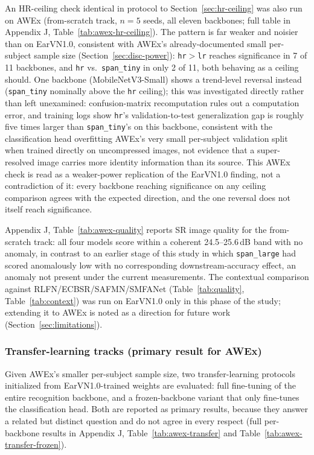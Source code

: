 \documentclass[pdflatex,sn-vancouver-num]{sn-jnl}
\begin{document}
An HR-ceiling check identical in protocol to Section~\ref{sec:hr-ceiling} was also run on AWEx (from-scratch track, $n=5$ seeds, all eleven backbones; full table in Appendix J, Table~\ref{tab:awex-hr-ceiling}). The pattern is far weaker and noisier than on EarVN1.0, consistent with AWEx's already-documented small per-subject sample size (Section~\ref{sec:disc-power}): \texttt{hr}$>$\texttt{lr} reaches significance in 7 of 11 backbones, and \texttt{hr} vs.\ \texttt{span\_tiny} in only 2 of 11, both behaving as a ceiling should. One backbone (MobileNetV3-Small) shows a trend-level reversal instead (\texttt{span\_tiny} nominally above the \texttt{hr} ceiling); this was investigated directly rather than left unexamined: confusion-matrix recomputation rules out a computation error, and training logs show \texttt{hr}'s validation-to-test generalization gap is roughly five times larger than \texttt{span\_tiny}'s on this backbone, consistent with the classification head overfitting AWEx's very small per-subject validation split when trained directly on uncompressed images, not evidence that a super-resolved image carries more identity information than its source. This AWEx check is read as a weaker-power replication of the EarVN1.0 finding, not a contradiction of it: every backbone reaching significance on any ceiling comparison agrees with the expected direction, and the one reversal does not itself reach significance.

Appendix J, Table~\ref{tab:awex-quality} reports SR image quality for the from-scratch track: all four models score within a coherent 24.5--25.6\,dB band with no anomaly, in contrast to an earlier stage of this study in which \texttt{span\_large} had scored anomalously low with no corresponding downstream-accuracy effect, an anomaly not present under the current measurements. The contextual comparison against RLFN/ECBSR/SAFMN/SMFANet (Table~\ref{tab:quality}, Table~\ref{tab:context}) was run on EarVN1.0 only in this phase of the study; extending it to AWEx is noted as a direction for future work (Section~\ref{sec:limitations}).

\subsubsection{Transfer-learning tracks (primary result for AWEx)}
\label{sec:res-awex-transfer}

Given AWEx's smaller per-subject sample size, two transfer-learning protocols initialized from EarVN1.0-trained weights are evaluated: full fine-tuning of the entire recognition backbone, and a frozen-backbone variant that only fine-tunes the classification head. Both are reported as primary results, because they answer a related but distinct question and do not agree in every respect (full per-backbone results in Appendix J, Table~\ref{tab:awex-transfer} and Table~\ref{tab:awex-transfer-frozen}).
\end{document}
